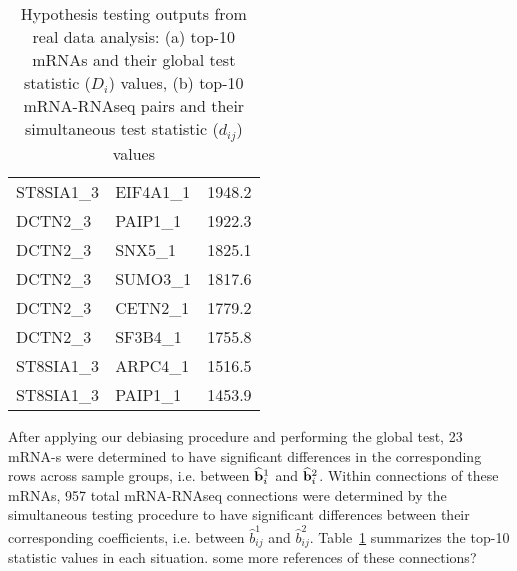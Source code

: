 \begin{table}[t!]
\begin{minipage}{.5\linewidth}
\begin{tabular}{lll}
ST8SIA1\_3 & EIF4A1\_1  & 1948.2    \\ 
DCTN2\_3   & PAIP1\_1   & 1922.3    \\ 
DCTN2\_3   & SNX5\_1    & 1825.1    \\ 
DCTN2\_3   & SUMO3\_1   & 1817.6    \\ 
DCTN2\_3   & CETN2\_1   & 1779.2    \\ 
DCTN2\_3   & SF3B4\_1   & 1755.8    \\ 
ST8SIA1\_3 & ARPC4\_1   & 1516.5    \\ 
ST8SIA1\_3 & PAIP1\_1   & 1453.9    \\\hline
\end{tabular}
\end{minipage}
\caption{Hypothesis testing outputs from real data analysis: (a) top-10 mRNAs and their global test statistic ($D_i$) values, (b) top-10 mRNA-RNAseq pairs and their simultaneous test statistic ($d_{ij}$) values}
\label{table:realtesting}
\end{table}

After applying our debiasing procedure and performing the global test, 23 mRNA-s were determined to have significant differences in the corresponding rows across sample groups, i.e. between $\widehat {{\bf{b}}}_i^1$ and $\widehat {{\bf{b}}}_i^2$. Within connections of these mRNAs, 957 total mRNA-RNAseq connections were determined by the simultaneous testing procedure to have significant differences between their corresponding coefficients, i.e. between $\hat b_{ij}^1$ and $\hat b_{ij}^2$. Table~\ref{table:realtesting} summarizes the top-10 statistic values in each situation. {\colrbf some more references of these connections?}
